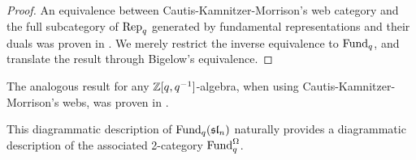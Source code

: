 \begin{proof}  An equivalence between Cautis-Kamnitzer-Morrison's web category and the full subcategory of $\operatorname{Rep}_q$ generated by fundamental representations and their duals was proven in \cite[Theorem 3.3.1]{CKM}. We merely restrict the inverse equivalence to $\operatorname{Fund}_q$, and translate the result through Bigelow's equivalence. \end{proof}

\begin{remark} The analogous result for any $\mathbb{Z}[q,q^{-1}]$-algebra, when using Cautis-Kamnitzer-Morrison's webs, was proven in \cite{ELLCC}. \end{remark}


This diagrammatic description of $\operatorname{Fund}_q(\mathfrak{sl}_n)$ naturally provides a diagrammatic description of the associated 2-category $\operatorname{Fund}_q^{\Omega}$.

